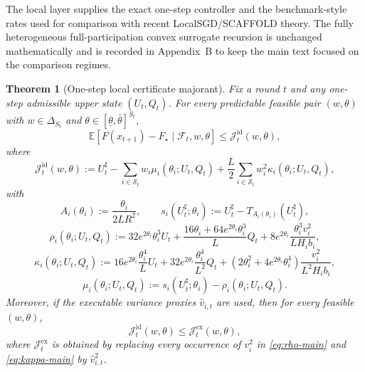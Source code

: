 \documentclass{article}
\newtheorem{theorem}{Theorem}[section]
\theoremstyle{definition}
\newcommand{\EE}{\mathbb E}
\newcommand{\cF}{\mathcal F}
\begin{document}
The local layer supplies the exact one-step controller and the benchmark-style rates used for comparison with recent LocalSGD/SCAFFOLD theory. The fully heterogeneous full-participation convex surrogate recursion is unchanged mathematically and is recorded in Appendix~B to keep the main text focused on the comparison regimes.
\begin{theorem}[One-step local certificate majorant]
\label{th:predictive-majorant}
Fix a round $t$ and any one-step admissible upper state $(U_t,Q_t)$. For every
predictable feasible pair $(w,\theta)$ with $w\in\Delta_{S_t}$ and
$\theta\in[\underline\theta,\bar\theta]^{S_t}$,
\begin{equation}
\EE[F(x_{t+1})-F_\star\mid \cF_t,w,\theta]
\le
\mathcal J_t^{\mathrm{id}}(w,\theta),
\label{eq:main-one-step}\end{equation}
where
\[
\mathcal J_t^{\mathrm{id}}(w,\theta)
:=
U_t^\sharp
-
\sum_{i\in\mathcal S_t}w_i \mu_i(\theta_i;U_t,Q_t)
+
\frac{L}{2}\sum_{i\in\mathcal S_t}w_i^2 \kappa_i(\theta_i;U_t,Q_t),
\]
with
\[
A_i(\theta_i):=\frac{\theta_i}{2LR^2},
\qquad
s_i(U_t^\sharp;\theta_i):=U_t^\sharp-T_{A_i(\theta_i)}(U_t^\sharp),
\]
\begin{equation}
\rho_i(\theta_i;U_t,Q_t)
:=
32 e^{2\theta_i}\theta_i^3 U_t
+
\frac{16\theta_i+64 e^{2\theta_i}\theta_i^3}{L}Q_t
+
8 e^{2\theta_i}\frac{\theta_i^3 v_i^2}{L H_i b_i},
\label{eq:rho-main}\end{equation}
\begin{equation}
\kappa_i(\theta_i;U_t,Q_t)
:=
16 e^{2\theta_i}\frac{\theta_i^4}{L}U_t
+
32 e^{2\theta_i}\frac{\theta_i^4}{L^2}Q_t
+
\left(2\theta_i^2+4 e^{2\theta_i}\theta_i^4\right)\frac{v_i^2}{L^2 H_i b_i},
\label{eq:kappa-main}\end{equation}
\[
\mu_i(\theta_i;U_t,Q_t)
:=
s_i(U_t^\sharp;\theta_i)-\rho_i(\theta_i;U_t,Q_t).
\]
Moreover, if the executable variance proxies $\widehat v_{i,t}$ are used, then
for every feasible $(w,\theta)$,
\[
\mathcal J_t^{\mathrm{id}}(w,\theta)
\le
\mathcal J_t^{\mathrm{ex}}(w,\theta),
\]
where $\mathcal J_t^{\mathrm{ex}}$ is obtained by replacing every occurrence of
$v_i^2$ in \eqref{eq:rho-main} and \eqref{eq:kappa-main} by
$\widehat v_{i,t}^2$.
\end{theorem}
\end{document}
